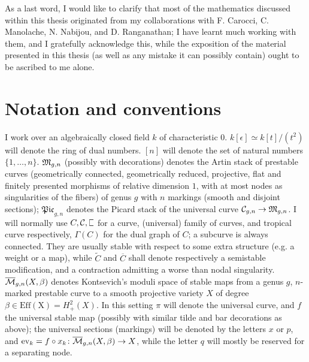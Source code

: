 As a last word, I would like to clarify that most of the mathematics discussed within this thesis originated from my collaborations with F. Carocci, C. Manolache, N. Nabijou, and D. Ranganathan; I have learnt much working with them, and I gratefully acknowledge this, while the exposition of the material presented in this thesis (as well as any mistake it can possibly contain) ought to be ascribed to me alone.

\section*{Notation and conventions}
I work over an algebraically closed field $k$ of characteristic $0$. $k[\epsilon]\simeq k[t]/(t^2)$ will denote the ring of dual numbers. $[n]$ will denote the set of natural numbers $\{1,\ldots,n\}$. $\mathfrak M_{g,n}$ (possibly with decorations) denotes the Artin stack of prestable curves (geometrically connected, geometrically reduced, projective, flat and finitely presented morphisms of relative dimension $1$, with at most nodes as singularities of the fibers) of genus $g$ with $n$ markings (smooth and disjoint sections); $\mathfrak{Pic}_{g,n}$ denotes the Picard stack of the universal curve $\mathcal C_{g,n}\rightarrow\mathfrak M_{g,n}$. I will normally use $C,\mathcal C,\plC$ for a curve, (universal) family of curves, and tropical curve respectively, $\Gamma(C)$ for the dual graph of $C$; a subcurve is always connected. They are usually stable with respect to some extra structure (e.g. a weight or a map), while $\widetilde{C}$ and $\overline{C}$ shall denote respectively a semistable modification, and a contraction admitting a worse than nodal singularity. $\overline{\mathcal{M}}_{g,n}(X,\beta)$ denotes Kontsevich's moduli space of stable maps from a genus $g$, $n$-marked prestable curve to a smooth projective variety $X$ of degree $\beta\in\operatorname{Eff(X)}=H^2_+(X)$. In this setting $\pi$ will denote the universal curve, and $f$ the universal stable map (possibly with similar tilde and bar decorations as above); the universal sections (markings) will be denoted by the letters $x$ or $p$, and $\operatorname{ev}_k=f\circ x_k\colon \overline{\mathcal{M}}_{g,n}(X,\beta)\rightarrow X$, while the letter $q$ will mostly be reserved for a separating node.
